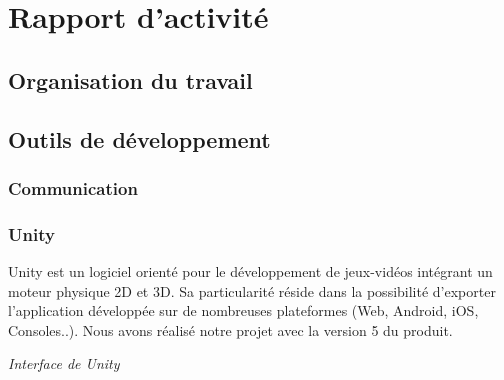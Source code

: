 \section{Rapport d'activité}

\subsection{Organisation du travail}


\subsection{Outils de développement}



\subsubsection{Communication}


\subsubsection{Unity}

Unity est un logiciel orienté pour le développement de jeux-vidéos intégrant un moteur physique 2D et 3D. Sa particularité réside dans la possibilité d'exporter l'application développée sur de nombreuses plateformes (Web, Android, iOS, Consoles..). Nous avons réalisé notre projet avec la version 5 du produit.

\begin{center}
\textit{Interface de Unity}
\end{center}


